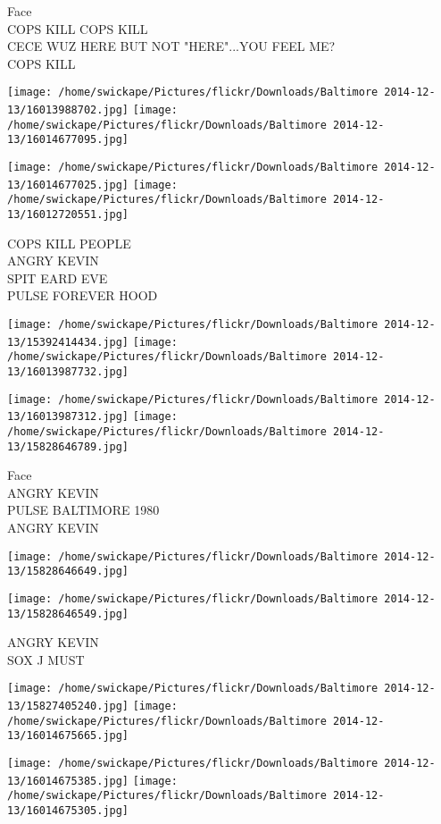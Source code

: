 \documentclass[10pt,letterpaper]{article}
\begin{document}
Face\\
COPS KILL COPS KILL\\
CECE WUZ HERE BUT NOT "HERE"...YOU FEEL ME?\\
COPS KILL
\pagebreak

\texttt{[image: /home/swickape/Pictures/flickr/Downloads/Baltimore 2014-12-13/16013988702.jpg]}
\texttt{[image: /home/swickape/Pictures/flickr/Downloads/Baltimore 2014-12-13/16014677095.jpg]}

\texttt{[image: /home/swickape/Pictures/flickr/Downloads/Baltimore 2014-12-13/16014677025.jpg]}
\texttt{[image: /home/swickape/Pictures/flickr/Downloads/Baltimore 2014-12-13/16012720551.jpg]}

COPS KILL PEOPLE\\
ANGRY KEVIN\\
SPIT EARD EVE\\
PULSE FOREVER HOOD
\pagebreak

\texttt{[image: /home/swickape/Pictures/flickr/Downloads/Baltimore 2014-12-13/15392414434.jpg]}
\texttt{[image: /home/swickape/Pictures/flickr/Downloads/Baltimore 2014-12-13/16013987732.jpg]}

\texttt{[image: /home/swickape/Pictures/flickr/Downloads/Baltimore 2014-12-13/16013987312.jpg]}
\texttt{[image: /home/swickape/Pictures/flickr/Downloads/Baltimore 2014-12-13/15828646789.jpg]}

Face\\
ANGRY KEVIN\\
PULSE BALTIMORE 1980\\
ANGRY KEVIN
\pagebreak

\texttt{[image: /home/swickape/Pictures/flickr/Downloads/Baltimore 2014-12-13/15828646649.jpg]}

\vspace{0.25in}
\texttt{[image: /home/swickape/Pictures/flickr/Downloads/Baltimore 2014-12-13/15828646549.jpg]}

ANGRY KEVIN\\
SOX J MUST
\pagebreak

\texttt{[image: /home/swickape/Pictures/flickr/Downloads/Baltimore 2014-12-13/15827405240.jpg]}
\texttt{[image: /home/swickape/Pictures/flickr/Downloads/Baltimore 2014-12-13/16014675665.jpg]}

\texttt{[image: /home/swickape/Pictures/flickr/Downloads/Baltimore 2014-12-13/16014675385.jpg]}
\texttt{[image: /home/swickape/Pictures/flickr/Downloads/Baltimore 2014-12-13/16014675305.jpg]}
\end{document}
